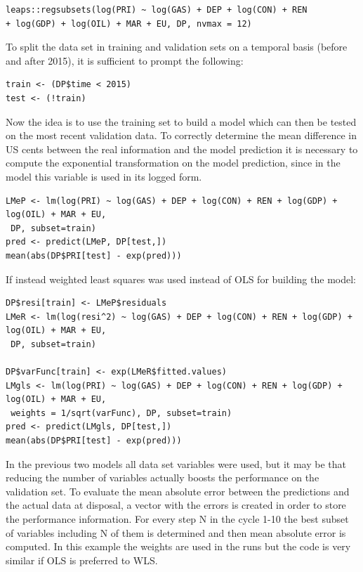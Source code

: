 \documentclass{book}
\begin{document}
\begin{verbatim}
leaps::regsubsets(log(PRI) ~ log(GAS) + DEP + log(CON) + REN
+ log(GDP) + log(OIL) + MAR + EU, DP, nvmax = 12)
\end{verbatim}

To split the data set in training and validation sets on a temporal basis (before and after 2015), it is sufficient to prompt the following:

\begin{verbatim}
train <- (DP$time < 2015)
test <- (!train)
\end{verbatim}

Now the idea is to use the training set to build a model which can then be tested on the most recent validation data. To correctly determine the mean difference in US cents between the real information and the model prediction it is necessary to compute the exponential transformation on the model prediction, since in the model this variable is used in its logged form.

\begin{verbatim}
LMeP <- lm(log(PRI) ~ log(GAS) + DEP + log(CON) + REN + log(GDP) + log(OIL) + MAR + EU,
 DP, subset=train)
pred <- predict(LMeP, DP[test,])
mean(abs(DP$PRI[test] - exp(pred)))
\end{verbatim}

If instead weighted least squares was used instead of OLS for building the model:

\begin{verbatim}
DP$resi[train] <- LMeP$residuals
LMeR <- lm(log(resi^2) ~ log(GAS) + DEP + log(CON) + REN + log(GDP) + log(OIL) + MAR + EU,
 DP, subset=train)

DP$varFunc[train] <- exp(LMeR$fitted.values)
LMgls <- lm(log(PRI) ~ log(GAS) + DEP + log(CON) + REN + log(GDP) + log(OIL) + MAR + EU,
 weights = 1/sqrt(varFunc), DP, subset=train)
pred <- predict(LMgls, DP[test,])
mean(abs(DP$PRI[test] - exp(pred)))
\end{verbatim}

In the previous two models all data set variables were used, but it may be that reducing the number of variables actually boosts the performance on the validation set. To evaluate the mean absolute error between the predictions and the actual data at disposal, a vector with the errors is created in order to store the performance information. For every step N in the cycle 1-10 the best subset of variables including N of them is determined and then mean absolute error is computed. In this example the weights are used in the runs but the code is very similar if OLS is preferred to WLS.
\end{document}
